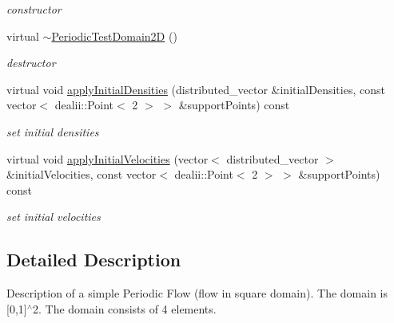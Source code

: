 \begin{DoxyCompactItemize}
\begin{DoxyCompactList}\small\item\em constructor \end{DoxyCompactList}\item 
\hypertarget{classnatrium_1_1PeriodicTestDomain2D_a7addeeedd4ece6367394ce17eb7cb589}{virtual \hyperlink{classnatrium_1_1PeriodicTestDomain2D_a7addeeedd4ece6367394ce17eb7cb589}{$\sim$\-Periodic\-Test\-Domain2\-D} ()}\label{classnatrium_1_1PeriodicTestDomain2D_a7addeeedd4ece6367394ce17eb7cb589}

\begin{DoxyCompactList}\small\item\em destructor \end{DoxyCompactList}\item 
virtual void \hyperlink{classnatrium_1_1PeriodicTestDomain2D_ae2a3a181175afa80e73097e51ef8b242}{apply\-Initial\-Densities} (distributed\-\_\-vector \&initial\-Densities, const vector$<$ dealii\-::\-Point$<$ 2 $>$ $>$ \&support\-Points) const 
\begin{DoxyCompactList}\small\item\em set initial densities \end{DoxyCompactList}\item 
virtual void \hyperlink{classnatrium_1_1PeriodicTestDomain2D_a52663163abcc41edd8491db3ea4d3b4c}{apply\-Initial\-Velocities} (vector$<$ distributed\-\_\-vector $>$ \&initial\-Velocities, const vector$<$ dealii\-::\-Point$<$ 2 $>$ $>$ \&support\-Points) const 
\begin{DoxyCompactList}\small\item\em set initial velocities \end{DoxyCompactList}\end{DoxyCompactItemize}


\subsection{Detailed Description}
Description of a simple Periodic Flow (flow in square domain). The domain is \mbox{[}0,1\mbox{]}$^\wedge$2. The domain consists of 4 elements. 

